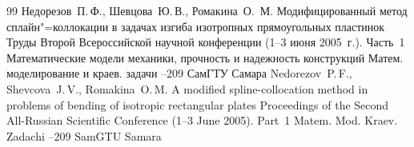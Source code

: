 \begin{thebibliography}{99}
\by Недорезов~П.\,Ф., Шевцова~Ю.\,В., Ромакина~О.~М.
\paper Модифицированный метод сплайн"=коллокации в задачах изгиба изотропных прямоугольных пластинок
\inbook Труды Второй Всероссийской научной конференции \rm (1--3 июня 2005~г.). Часть~1
\bookinfo Математические модели механики, прочность и надежность конструкций
\serial Матем. моделирование и краев. задачи
--209
\publ СамГТУ
\publaddr Самара
\misctransl
\by Nedorezov~P.\,F., Shevcova~J.\,V., Romakina~O.\,M.
\paper A modified spline-collocation method  in problems of bending of isotropic rectangular plates
\inbook Proceedings of the Second All-Russian Scientific Conference \rm (1--3 June 2005). Part~1
\serial Matem. Mod. Kraev. Zadachi
--209
\publ SamGTU
\publaddr Samara

\end{thebibliography}


\noindent
\hskip6.5cm \thedate \par\noindent
\hskip6.5cm\therevdate


\newpage



\makeengtitlem

\newpage

%
